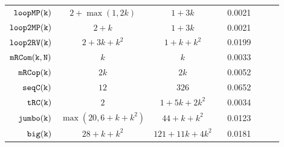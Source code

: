{\begin {table}[H]
\begin{center}
{\begin{tabular}{ | >{\tiny}r | c | c | c | c | c  |}
         {$ \mathtt{loopMP(k)}$}  &  $ 2 + \max(1,2k) $ & $1 + 3k  $  &  ~ 0.0021 ~ \\
         {$ \mathtt{loop2MP(k)}$}  &  $ 2 + k $ & $1 + 3k  $  &  ~ 0.0021 ~ \\
         {$\mathtt{loop2RV(k)}$}&  $2 + 3k + k^2$ &  $1 + k + k^2$  &  ~ 0.0199 ~ \\
         $  \mathtt{mRCom(k, N)}$ & $ k   $ & $k $   &  ~ 0.0033 ~ \\
         $  \mathtt{mRCop(k)}$  & $  2k $ & $ 2k $   &  ~ 0.0052 ~ \\
         $  \mathtt{seqC(k)}$ & $12  $  & $326 $  &  ~ 0.0652 ~ \\
         $  \mathtt{tRC(k)}$ &  $ 2$ & $ 1 + 5k + 2 k^2 $  &  ~ 0.0034 ~ \\
         $  \mathtt{{jumbo(k)}}$ & $  \max(20, 6+k+k^2)$   &   $ {44+k+k^2} $  &  ~ 0.0123 ~ \\
         $  {\mathtt{big(k)}} $ &   $28 + k + k^2$ &  $121+11k+4k^2 $  &  ~ 0.0181 ~ \\
        \hline \hline 
        \end{tabular}
}
\end{center}
\end{table}
}


